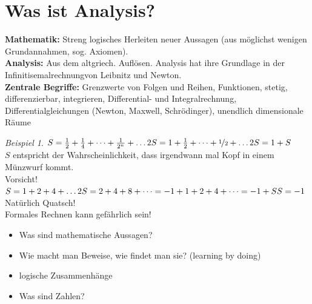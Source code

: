 \documentclass[12pt,a4paper,titlepage]{article} %
\theoremstyle{definition}
\theoremstyle{remark}
\newtheorem*{bsp}{Beispiel}
\begin{document}
\section{Was ist Analysis?}
\textbf{Mathematik:} Streng logisches Herleiten neuer Aussagen (aus möglichst wenigen Grundannahmen, sog. Axiomen).\\
\textbf{Analysis:} Aus dem altgriech. \glqq Auflösen\grqq. Analysis hat ihre Grundlage in der \glqq Infinitisemalrechnung\grqq  von Leibnitz und Newton.\\
\textbf{Zentrale Begriffe:} Grenzwerte von Folgen und Reihen, Funktionen, stetig, differenzierbar, integrieren, Differential- und Integralrechnung, Differentialgleichungen (Newton, Maxwell, Schrödinger), unendlich dimensionale Räume
\begin{bsp}
	\(S = \frac{1}{2} + \frac{1}{4} + \dots + \frac{1}{2^n} + \dots\\
	2S = 1 + \frac{1}{2} + \dots + \nicefrac{1}{2} + \dots\\
	2S = 1 + S\)\\
	\(S\) entspricht der Wahrscheinlichkeit, dass irgendwann mal Kopf in einem Münzwurf kommt.\\
	Vorsicht!\\
	\(S = 1 + 2 + 4 + \dots\\
	2S = 2 + 4 + 8 + \dots = -1 + 1 + 2 + 4 + \dots = -1 + S\\
	S = -1\)\\
	Natürlich Quatsch!\\
  	Formales Rechnen kann gefährlich sein!

	\begin{itemize}
		\item Was sind mathematische Aussagen?
		\item Wie macht man Beweise, wie findet man sie? (learning by doing)
		\item logische Zusammenhänge
		\item Was sind Zahlen?
	\end{itemize}
\end{bsp}
\end{document}
